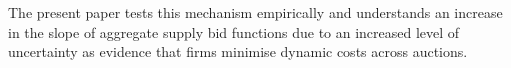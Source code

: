 The present paper tests this mechanism empirically and understands an increase in the slope of aggregate supply bid functions due to an increased level of uncertainty as evidence that firms minimise dynamic costs across auctions. %


%
%
%


%

